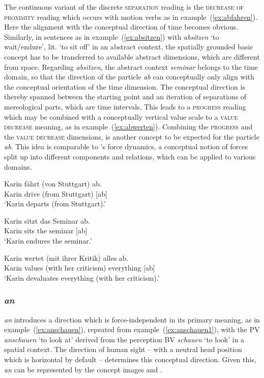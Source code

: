 \documentclass[output=paper]{langsci/langscibook}
\begin{document}
The continuous variant of the discrete \textsc{separation} reading is
the \textsc{decrease of proximity} reading which occurs with motion
verbs as in example~(\ref{ex:abfahren}). Here the alignment with the
conceptual direction of time becomes obvious. Similarly, in sentences
as in example~(\ref{ex:absitzen}) with \textit{absitzen} `to
wait/endure', lit. `to sit off' in an abstract context, the spatially
grounded basic concept has to be transferred to available abstract
dimensions, which are different from space. Regarding
\textit{absitzen}, the abstract context \textit{seminar} belongs to
the time domain, so that the direction of the particle \textit{ab} can
conceptually only align with the conceptual orientation of the time
dimension. The conceptual direction is thereby spanned between the
starting point and an iteration of separations of mereological parts,
which are time intervals. This leads to a \textsc{progress} reading
which may be combined with a conceptually vertical value scale
\citep{Tversky:11} to a \textsc{value decrease} meaning, as in
example~(\ref{ex:abwerten}). Combining the \textsc{progress} and the
\textsc{value decrease} dimensions,  is another
concept to be expected for the particle \textit{ab}. This idea is
comparable to \cite{Talmy:00}'s force dynamics, a conceptual notion of
forces split up into different components and relations, which can be
applied to various domains.

\ea\label{ex:abfahren}
\gll Karin fährt (von Stuttgart) ab.\\
Karin drive (from Stuttgart) [ab]\\
\glt `Karin departs (from Stuttgart).'
\z
  
\ea\label{ex:absitzen}
\gll Karin sitzt das Seminar ab.\\
Karin sits the seminar [ab]\\
\glt `Karin endures the seminar.'
\z
  
\ea\label{ex:abwerten}
\gll Karin wertet (mit ihrer Kritik) alles ab.\\
Karin values (with her criticism) everything [ab]\\
\glt `Karin devaluates everything (with her criticism).'
\z


\subsubsection{\textit{an}}

\textit{an} introduces a direction which is force-independent in its
primary meaning, as in example~(\ref{ex:anschauen}), repeated from
example~(\ref{ex:anschauen1}), with the PV \textit{anschauen} `to
look at' derived from the perception BV \textit{schauen} `to look'
in a spatial context. The direction of human sight -- with a neutral
head position which is horizontal by default -- determines this
conceptual direction. Given this, \textit{an} can be represented by
the concept images  and .
\end{document}
